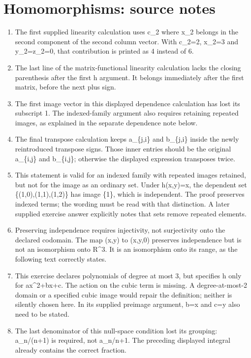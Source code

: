 \section*{Homomorphisms: source notes}
\begin{enumerate}
\item The first supplied linearity calculation uses c\_2 where x\_2 belongs in the second component of the second column vector. With c\_2=2, x\_2=3 and y\_2=z\_2=0, that contribution is printed as 4 instead of 6.
\item The last line of the matrix-functional linearity calculation lacks the closing parenthesis after the first h argument. It belongs immediately after the first matrix, before the next plus sign.
\item The first image vector in this displayed dependence calculation has lost its subscript 1. The indexed-family argument also requires retaining repeated images, as explained in the separate dependence note below.
\item The final transpose calculation keeps a\_\{j,i\} and b\_\{j,i\} inside the newly reintroduced transpose signs. Those inner entries should be the original a\_\{i,j\} and b\_\{i,j\}; otherwise the displayed expression transposes twice.
\item This statement is valid for an indexed family with repeated images retained, but not for the image as an ordinary set. Under h(x,y)=x, the dependent set \{(1,0),(1,1),(1,2)\} has image \{1\}, which is independent. The proof preserves indexed terms; the wording must be read with that distinction. A later supplied exercise answer explicitly notes that sets remove repeated elements.
\item Preserving independence requires injectivity, not surjectivity onto the declared codomain. The map (x,y) to (x,y,0) preserves independence but is not an isomorphism onto R\textasciicircum{}3. It is an isomorphism onto its range, as the following text correctly states.
\item This exercise declares polynomials of degree at most 3, but specifies h only for ax\textasciicircum{}2+bx+c. The action on the cubic term is missing. A degree-at-most-2 domain or a specified cubic image would repair the definition; neither is silently chosen here. In its supplied preimage argument, b=x and c=y also need to be stated.
\item The last denominator of this null-space condition lost its grouping: a\_n/(n+1) is required, not a\_n/n+1. The preceding displayed integral already contains the correct fraction.

\end{enumerate}
